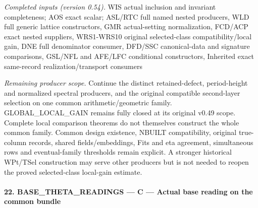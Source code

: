 \emph{Completed inputs (version 0.54).} WIS actual inclusion and invariant completeness; AOS exact scalar; ASL/RTC full named nested producers, WLD full generic lattice constructors, GMR actual-setting normalization, FCD/ACP exact nested suppliers, WRS1-WRS10 original selected-class compatibility/local gain, DNE full denominator consumer, DFD/SSC canonical-data and signature comparisons, GSL/NFL and AFE/LFC conditional constructors, Inherited exact same-record realization/transport consumers

\emph{Remaining producer scope.} Continue the distinct retained-defect, period-height and normalized spectral producers, and the original compatible second-layer selection on one common arithmetic/geometric family. GLOBAL\_\allowbreak LOCAL\_\allowbreak GAIN remains fully closed at its original v0.49 scope. Complete local comparison theorems do not themselves construct the whole common family. Common design existence, NBUILT compatibility, original true-column records, shared fields/embeddings, Fits and eta agreement, simultaneous rows and eventual-family thresholds remain explicit. A stronger historical WPt/TSel construction may serve other producers but is not needed to reopen the proved selected-class local-gain estimate.



\paragraph{22. BASE\_\allowbreak THETA\_\allowbreak READINGS — C — Actual base reading on the common bundle}

